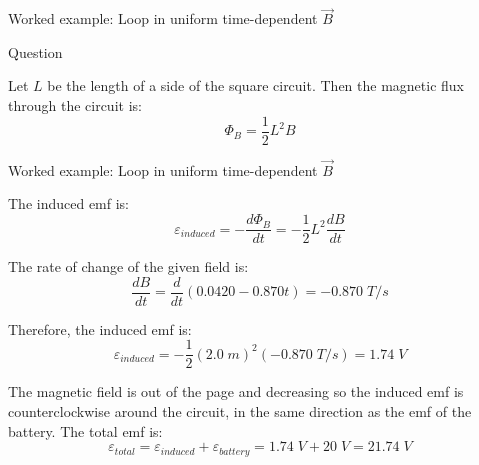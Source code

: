 {\begin{frame}{Worked example: Loop in uniform time-dependent $\vec{B}$}
\begin{blockexmplque}{Question}
  \end{blockexmplque}

  Let $L$ be the length of a side of the square circuit.
  Then the magnetic flux through the circuit is:
  \begin{equation*}
    \Phi_B = \frac{1}{2} L^2 B
  \end{equation*}

\end{frame}

%
%
%

\begin{frame}{Worked example: Loop in uniform time-dependent $\vec{B}$}

  The induced emf is:
  \begin{equation*}
    \varepsilon_{induced} = - \frac{d\Phi_{B}}{dt} = - \frac{1}{2} L^2 \frac{dB}{dt}
  \end{equation*}

  The rate of change of the given field is:
  \begin{equation*}
    \frac{dB}{dt} = \frac{d}{dt} (0.0420 - 0.870t) = -0.870 \; T/s
  \end{equation*}

  Therefore, the induced emf is:
  \begin{equation*}
    \varepsilon_{induced} = - \frac{1}{2} (2.0 \; m)^2 (-0.870 \; T/s) = 1.74 \; V
  \end{equation*}

  The magnetic field is out of the page and decreasing so the induced emf is
  counterclockwise around the circuit, in the same direction
  as the emf of the battery. The total emf is:
  \begin{equation*}
    \varepsilon_{total} =
      \varepsilon_{induced} + \varepsilon_{battery} = 1.74 \; V + 20 \; V = 21.74 \; V
  \end{equation*}

\end{frame}

} %


%
%

